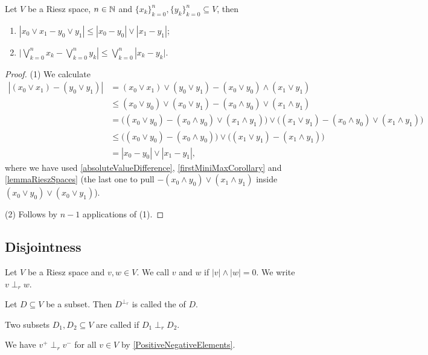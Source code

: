 \begin{proposition} \label{differenceOfSupremaLessThanSupremumOfDifferences}
Let $V$ be a Riesz space, $n\in\mathbb{N}$ and $\{x_k\}_{k=0}^n,\{y_k\}_{k=0}^n\subseteq V$, then
\begin{enumerate}
\item $|x_0\vee x_1 - y_0\vee y_1| \leq |x_0 - y_0|\vee |x_1 - y_1|$;
\item $\Big|\bigvee_{k=0}^n x_k - \bigvee_{k=0}^n y_k| \leq \bigvee_{k=0}^n|x_k - y_k|$.
\end{enumerate}
\end{proposition}
\begin{proof}
(1) We calculate
\begin{align*}
|(x_0\vee x_1)- (y_0\vee y_1)| &= (x_0\vee x_1)\vee(y_0\vee y_1) - (x_0\vee y_0)\wedge (x_1\vee y_1) \\
&\leq (x_0\vee y_0)\vee(x_0\vee y_1) - (x_0\wedge y_0)\vee (x_1\wedge y_1) \\
&= \Big((x_0\vee y_0) - (x_0\wedge y_0)\vee (x_1\wedge y_1)\Big)\vee\Big((x_1\vee y_1) - (x_0\wedge y_0)\vee (x_1\wedge y_1)\Big) \\
&\leq \big((x_0\vee y_0) - (x_0\wedge y_0)\big)\vee\big((x_1\vee y_1) - (x_1\wedge y_1)\big) \\
&= |x_0-y_0|\vee |x_1-y_1|,
\end{align*}
where we have used \ref{absoluteValueDifference}, \ref{firstMiniMaxCorollary} and \ref{lemmaRieszSpaces} (the last one to pull $-(x_0\wedge y_0)\vee (x_1\wedge y_1)$ inside $(x_0\vee y_0)\vee(x_0\vee y_1)$).

(2) Follows by $n-1$ applications of (1).
\end{proof}


\subsection{Disjointness}
\begin{definition}
Let $V$ be a Riesz space and $v,w\in V$. We call $v$ and $w$  if $|v|\wedge |w| = 0$. We write $v\perp_r w$.

Let $D\subseteq V$ be a subset. Then $D^{\perp_r}$ is called the  of $D$.

Two subsets $D_1,D_2\subseteq V$ are called  if $D_1 \perp_r D_2$.
\end{definition}
We have $v^+\perp_r v^-$ for all $v\in V$ by \ref{PositiveNegativeElements}.

